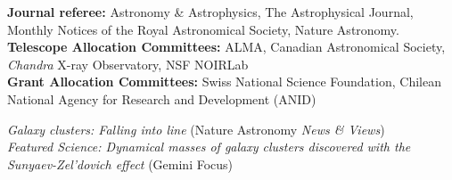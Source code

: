 \documentclass[11pt]{article}
\begin{document}


%


\noindent 
\textbf{Journal referee:} Astronomy \& Astrophysics, The Astrophysical Journal, Monthly Notices of the Royal Astronomical Society, Nature Astronomy.\\
\noindent
\textbf{Telescope Allocation Committees:}
ALMA, Canadian Astronomical Society, \textit{Chandra} X-ray Observatory, NSF NOIRLab\\
\noindent
\textbf{Grant Allocation Committees:} Swiss National Science Foundation, Chilean National Agency for Research and Development (ANID)




\noindent
 \emph{Galaxy clusters: Falling into line} (Nature Astronomy \emph{News \& Views})\\
 \emph{Featured Science: Dynamical masses of galaxy clusters discovered with the Sunyaev-Zel'dovich effect} (Gemini Focus)

\end{document}
